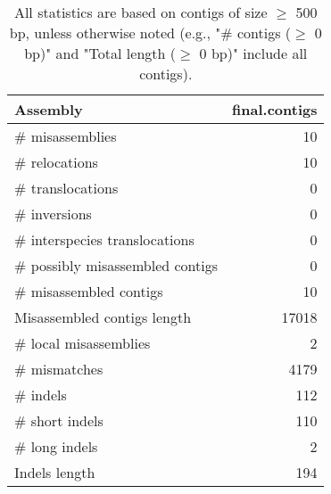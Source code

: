\documentclass[12pt,a4paper]{article}
\begin{document}
\begin{table}[ht]
\begin{center}
\caption{All statistics are based on contigs of size $\geq$ 500 bp, unless otherwise noted (e.g., "\# contigs ($\geq$ 0 bp)" and "Total length ($\geq$ 0 bp)" include all contigs).}
\begin{tabular}{|l*{1}{|r}|}
\hline
Assembly & final.contigs \\ \hline
\# misassemblies & 10 \\ \hline
\hspace{5mm}\# relocations & 10 \\ \hline
\hspace{5mm}\# translocations & 0 \\ \hline
\hspace{5mm}\# inversions & 0 \\ \hline
\hspace{5mm}\# interspecies translocations & 0 \\ \hline
\# possibly misassembled contigs & 0 \\ \hline
\# misassembled contigs & 10 \\ \hline
Misassembled contigs length & 17018 \\ \hline
\# local misassemblies & 2 \\ \hline
\# mismatches & 4179 \\ \hline
\# indels & 112 \\ \hline
\hspace{5mm}\# short indels & 110 \\ \hline
\hspace{5mm}\# long indels & 2 \\ \hline
Indels length & 194 \\ \hline
\end{tabular}
\end{center}
\end{table}
\end{document}
